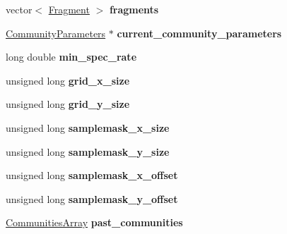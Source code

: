 \begin{DoxyCompactItemize}
\item 
vector$<$ \hyperlink{struct_fragment}{Fragment} $>$ {\bfseries fragments}\hypertarget{class_community_a8a17909b92a0cec3b63cec41e92796cb}{}\label{class_community_a8a17909b92a0cec3b63cec41e92796cb}

\item 
\hyperlink{struct_community_parameters}{Community\+Parameters} $\ast$ {\bfseries current\+\_\+community\+\_\+parameters}\hypertarget{class_community_a77e925f82bee5441d8ec45406066dcfb}{}\label{class_community_a77e925f82bee5441d8ec45406066dcfb}

\item 
long double {\bfseries min\+\_\+spec\+\_\+rate}\hypertarget{class_community_a9dc6f7d4ab75b382be85c2b74edac6b7}{}\label{class_community_a9dc6f7d4ab75b382be85c2b74edac6b7}

\item 
unsigned long {\bfseries grid\+\_\+x\+\_\+size}\hypertarget{class_community_a383dba82c8c76bf5c130c2bf4ac057e5}{}\label{class_community_a383dba82c8c76bf5c130c2bf4ac057e5}

\item 
unsigned long {\bfseries grid\+\_\+y\+\_\+size}\hypertarget{class_community_a308d12fa4ef95015860d4181b075c93f}{}\label{class_community_a308d12fa4ef95015860d4181b075c93f}

\item 
unsigned long {\bfseries samplemask\+\_\+x\+\_\+size}\hypertarget{class_community_a960bb6bb58eaec017d36d16cb3a3bc8a}{}\label{class_community_a960bb6bb58eaec017d36d16cb3a3bc8a}

\item 
unsigned long {\bfseries samplemask\+\_\+y\+\_\+size}\hypertarget{class_community_a10722b2fe8855460946f04f0ae69fd74}{}\label{class_community_a10722b2fe8855460946f04f0ae69fd74}

\item 
unsigned long {\bfseries samplemask\+\_\+x\+\_\+offset}\hypertarget{class_community_ac4985481c86bd62a50fa946699867216}{}\label{class_community_ac4985481c86bd62a50fa946699867216}

\item 
unsigned long {\bfseries samplemask\+\_\+y\+\_\+offset}\hypertarget{class_community_aeaebe975a46d62b70380e50ff7ebd09a}{}\label{class_community_aeaebe975a46d62b70380e50ff7ebd09a}

\item 
\hyperlink{struct_communities_array}{Communities\+Array} {\bfseries past\+\_\+communities}\hypertarget{class_community_a0726a962287af565658aaa8f9d9ea6c1}{}\label{class_community_a0726a962287af565658aaa8f9d9ea6c1}


\end{DoxyCompactItemize}
